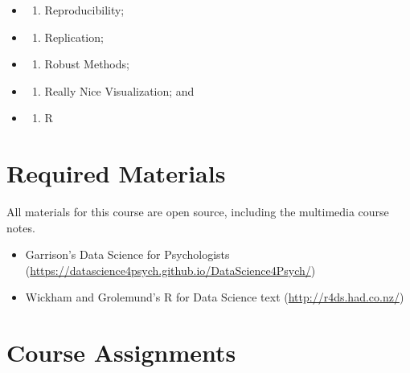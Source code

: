\begin{itemize}
\item
  \begin{enumerate}
  \def\labelenumi{\arabic{enumi}.}
  \tightlist
  \item
    Reproducibility;
  \end{enumerate}
\item
  \begin{enumerate}
  \def\labelenumi{\arabic{enumi}.}
  \setcounter{enumi}{1}
  \tightlist
  \item
    Replication;
  \end{enumerate}
\item
  \begin{enumerate}
  \def\labelenumi{\arabic{enumi}.}
  \setcounter{enumi}{2}
  \tightlist
  \item
    Robust Methods;
  \end{enumerate}
\item
  \begin{enumerate}
  \def\labelenumi{\arabic{enumi}.}
  \setcounter{enumi}{3}
  \tightlist
  \item
    Really Nice Visualization; and
  \end{enumerate}
\item
  \begin{enumerate}
  \def\labelenumi{\arabic{enumi}.}
  \setcounter{enumi}{4}
  \tightlist
  \item
    R
  \end{enumerate}
\end{itemize}

\hypertarget{required-materials-2}{%
\section*{Required Materials}\label{required-materials-2}}


All materials for this course are open source, including the multimedia course notes.

\begin{itemize}
\tightlist
\item
  Garrison's Data Science for Psychologists (\url{https://datascience4psych.github.io/DataScience4Psych/})
\item
  Wickham and Grolemund's R for Data Science text (\url{http://r4ds.had.co.nz/})
\end{itemize}

\hypertarget{course-assignments-3}{%
\section*{Course Assignments}\label{course-assignments-3}}


